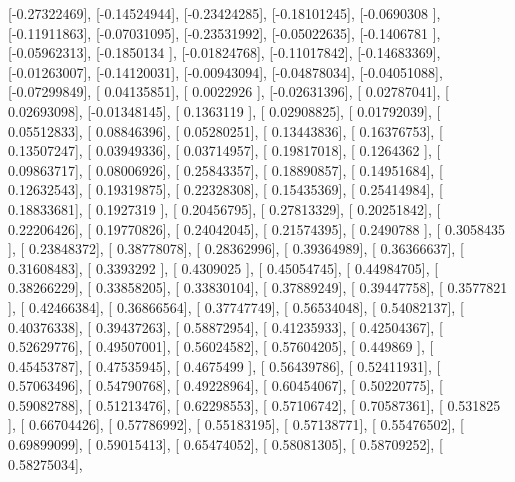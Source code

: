 \documentclass{article}
\begin{document}
       [-0.27322469],
       [-0.14524944],
       [-0.23424285],
       [-0.18101245],
       [-0.0690308 ],
       [-0.11911863],
       [-0.07031095],
       [-0.23531992],
       [-0.05022635],
       [-0.1406781 ],
       [-0.05962313],
       [-0.1850134 ],
       [-0.01824768],
       [-0.11017842],
       [-0.14683369],
       [-0.01263007],
       [-0.14120031],
       [-0.00943094],
       [-0.04878034],
       [-0.04051088],
       [-0.07299849],
       [ 0.04135851],
       [ 0.0022926 ],
       [-0.02631396],
       [ 0.02787041],
       [ 0.02693098],
       [-0.01348145],
       [ 0.1363119 ],
       [ 0.02908825],
       [ 0.01792039],
       [ 0.05512833],
       [ 0.08846396],
       [ 0.05280251],
       [ 0.13443836],
       [ 0.16376753],
       [ 0.13507247],
       [ 0.03949336],
       [ 0.03714957],
       [ 0.19817018],
       [ 0.1264362 ],
       [ 0.09863717],
       [ 0.08006926],
       [ 0.25843357],
       [ 0.18890857],
       [ 0.14951684],
       [ 0.12632543],
       [ 0.19319875],
       [ 0.22328308],
       [ 0.15435369],
       [ 0.25414984],
       [ 0.18833681],
       [ 0.1927319 ],
       [ 0.20456795],
       [ 0.27813329],
       [ 0.20251842],
       [ 0.22206426],
       [ 0.19770826],
       [ 0.24042045],
       [ 0.21574395],
       [ 0.2490788 ],
       [ 0.3058435 ],
       [ 0.23848372],
       [ 0.38778078],
       [ 0.28362996],
       [ 0.39364989],
       [ 0.36366637],
       [ 0.31608483],
       [ 0.3393292 ],
       [ 0.4309025 ],
       [ 0.45054745],
       [ 0.44984705],
       [ 0.38266229],
       [ 0.33858205],
       [ 0.33830104],
       [ 0.37889249],
       [ 0.39447758],
       [ 0.3577821 ],
       [ 0.42466384],
       [ 0.36866564],
       [ 0.37747749],
       [ 0.56534048],
       [ 0.54082137],
       [ 0.40376338],
       [ 0.39437263],
       [ 0.58872954],
       [ 0.41235933],
       [ 0.42504367],
       [ 0.52629776],
       [ 0.49507001],
       [ 0.56024582],
       [ 0.57604205],
       [ 0.449869  ],
       [ 0.45453787],
       [ 0.47535945],
       [ 0.4675499 ],
       [ 0.56439786],
       [ 0.52411931],
       [ 0.57063496],
       [ 0.54790768],
       [ 0.49228964],
       [ 0.60454067],
       [ 0.50220775],
       [ 0.59082788],
       [ 0.51213476],
       [ 0.62298553],
       [ 0.57106742],
       [ 0.70587361],
       [ 0.531825  ],
       [ 0.66704426],
       [ 0.57786992],
       [ 0.55183195],
       [ 0.57138771],
       [ 0.55476502],
       [ 0.69899099],
       [ 0.59015413],
       [ 0.65474052],
       [ 0.58081305],
       [ 0.58709252],
       [ 0.58275034],
\end{document}
